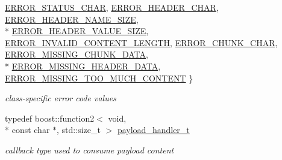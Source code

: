 \begin{DoxyCompactItemize}
\hyperlink{classpion_1_1http_1_1parser_a056c791c4b2dda0dd4c2037dd941d5d8a1df2c04224d1c647c08e7249bc666317}{E\-R\-R\-O\-R\-\_\-\-S\-T\-A\-T\-U\-S\-\_\-\-C\-H\-A\-R}, 
\hyperlink{classpion_1_1http_1_1parser_a056c791c4b2dda0dd4c2037dd941d5d8ae695d24cfd40b5354d5d3def0c7bbefd}{E\-R\-R\-O\-R\-\_\-\-H\-E\-A\-D\-E\-R\-\_\-\-C\-H\-A\-R}, 
\hyperlink{classpion_1_1http_1_1parser_a056c791c4b2dda0dd4c2037dd941d5d8a968de881fea53ccb84f3dc98c380ef53}{E\-R\-R\-O\-R\-\_\-\-H\-E\-A\-D\-E\-R\-\_\-\-N\-A\-M\-E\-\_\-\-S\-I\-Z\-E}, 
\\*
\hyperlink{classpion_1_1http_1_1parser_a056c791c4b2dda0dd4c2037dd941d5d8aa713c03b93494671a51a2097cbb9d1b9}{E\-R\-R\-O\-R\-\_\-\-H\-E\-A\-D\-E\-R\-\_\-\-V\-A\-L\-U\-E\-\_\-\-S\-I\-Z\-E}, 
\hyperlink{classpion_1_1http_1_1parser_a056c791c4b2dda0dd4c2037dd941d5d8af042c54007443f7919571b2cf6f52d70}{E\-R\-R\-O\-R\-\_\-\-I\-N\-V\-A\-L\-I\-D\-\_\-\-C\-O\-N\-T\-E\-N\-T\-\_\-\-L\-E\-N\-G\-T\-H}, 
\hyperlink{classpion_1_1http_1_1parser_a056c791c4b2dda0dd4c2037dd941d5d8abfd2136b613537506493c193b5e8caf1}{E\-R\-R\-O\-R\-\_\-\-C\-H\-U\-N\-K\-\_\-\-C\-H\-A\-R}, 
\hyperlink{classpion_1_1http_1_1parser_a056c791c4b2dda0dd4c2037dd941d5d8ade97f557fc11c10a56c93caa07ff5df2}{E\-R\-R\-O\-R\-\_\-\-M\-I\-S\-S\-I\-N\-G\-\_\-\-C\-H\-U\-N\-K\-\_\-\-D\-A\-T\-A}, 
\\*
\hyperlink{classpion_1_1http_1_1parser_a056c791c4b2dda0dd4c2037dd941d5d8ad3c9d5e280da006c16899b1c8a58c8fe}{E\-R\-R\-O\-R\-\_\-\-M\-I\-S\-S\-I\-N\-G\-\_\-\-H\-E\-A\-D\-E\-R\-\_\-\-D\-A\-T\-A}, 
\hyperlink{classpion_1_1http_1_1parser_a056c791c4b2dda0dd4c2037dd941d5d8aa652e202a02ae20a5fefe8d222d7df67}{E\-R\-R\-O\-R\-\_\-\-M\-I\-S\-S\-I\-N\-G\-\_\-\-T\-O\-O\-\_\-\-M\-U\-C\-H\-\_\-\-C\-O\-N\-T\-E\-N\-T}
 \}
\begin{DoxyCompactList}\small\item\em class-\/specific error code values \end{DoxyCompactList}\item 
typedef boost\-::function2$<$ void, \\*
const char $\ast$, std\-::size\-\_\-t $>$ \hyperlink{classpion_1_1http_1_1parser_abff772b79d2a912b0f9a4932d8f03a35}{payload\-\_\-handler\-\_\-t}
\begin{DoxyCompactList}\small\item\em callback type used to consume payload content \end{DoxyCompactList}\end{DoxyCompactItemize}
